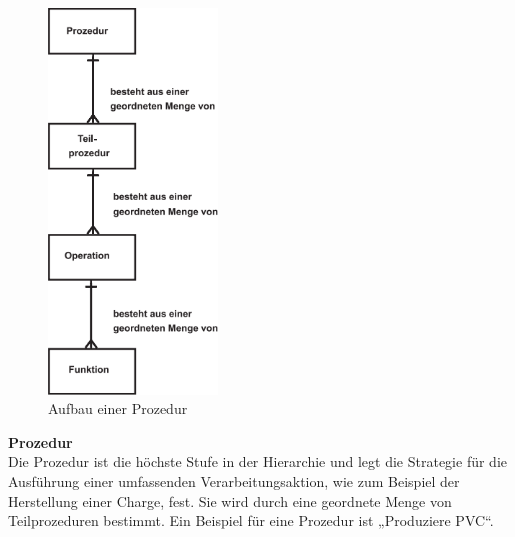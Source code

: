 \begin{figure}[h!]
		\centering
		\includegraphics[width=0.4\textwidth]{graphics/stateoftheart/prozedursteuerung.png}
		\caption{Aufbau einer Prozedur}
\end{figure} 
\newpage
\textbf{Prozedur}\\
Die Prozedur ist die höchste Stufe in der Hierarchie und legt die Strategie für die Ausführung einer umfassenden Verarbeitungsaktion, wie zum Beispiel der Herstellung einer Charge, fest. Sie wird durch eine geordnete Menge von Teilprozeduren bestimmt. Ein Beispiel für eine Prozedur ist „Produziere PVC“.\\

